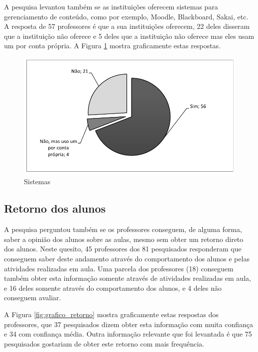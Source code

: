 A pesquisa levantou também se as instituições oferecem sistemas para gerenciamento de conteúdo, como por exemplo, Moodle, Blackboard, Sakai, etc. A resposta de 57 professores é que a sua instituições oferecem, 22 deles disseram que a instituição não oferece e 5 deles que a instituição não oferece mas eles usam um por conta própria. A Figura \ref{fig:grafico_sistemas} mostra graficamente estas respostas.

\begin{figure}[!h]
\centering
\includegraphics[width=1.0\textwidth]{pdfs/professores/img-grafico-sistemas.pdf} 
\caption{Sistemas}
\label{fig:grafico_sistemas} 
\end{figure}

\subsection{Retorno dos alunos}

A pesquisa perguntou também se os professores conseguem, de alguma forma, saber a opinião dos alunos sobre as aulas, mesmo sem obter um retorno direto dos alunos. Neste quesito, 45 professores dos 81 pesquisados responderam que conseguem saber deste andamento através do comportamento dos alunos e pelas atividades realizadas em aula. Uma parcela dos professores (18) conseguem também obter esta informação somente através de atividades realizadas em aula, e 16 deles somente através do comportamento dos alunos, e 4 deles não conseguem avaliar.

A Figura \ref{fig:grafico_retorno} mostra graficamente estas respostas dos professores, que 37 pesquisados dizem obter esta informação com muita confiança e 34 com confiança média. Outra informação relevante que foi levantada é que 75 pesquisados gostariam de obter este retorno com mais frequência.

